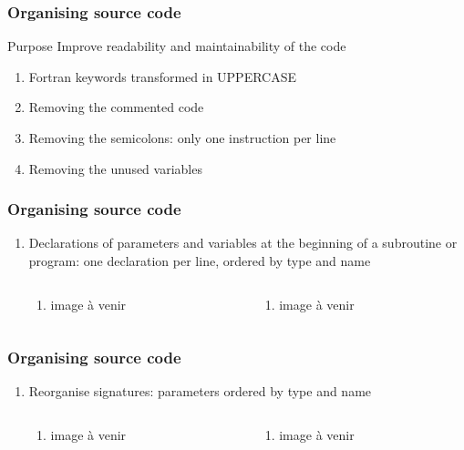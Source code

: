 \documentclass[10p]{beamer}
\begin{document}
\begin{frame}
\frametitle{Organising source code}
\begin{block}{Purpose}
Improve readability and maintainability of the code
\end{block}
\begin{enumerate}
\item Fortran keywords transformed in UPPERCASE
\item Removing the commented code
\item Removing the semicolons: only one instruction per line
\item Removing the unused variables
\end{enumerate}
\end{frame}

\begin{frame}
\frametitle{Organising source code}
\begin{enumerate}
\item Declarations of parameters and variables at the beginning of a subroutine or program: one declaration per line, ordered by type and name
\begin{columns}
\begin{column}{150 pt}
\begin{enumerate}
\item image à venir
\end{enumerate}
\end{column}
\begin{column}{150 pt}
\begin{enumerate}
\item image à venir
\end{enumerate}
\end{column}
\end{columns}
\end{enumerate}
\end{frame}

\begin{frame}
\frametitle{Organising source code}
\begin{enumerate}
\item Reorganise signatures: parameters ordered by type and name
\begin{columns}
\begin{column}{150 pt}
\begin{enumerate}
\item image à venir
\end{enumerate}
\end{column}
\begin{column}{150 pt}
\begin{enumerate}
\item image à venir
\end{enumerate}
\end{column}
\end{columns}
\end{enumerate}
\end{frame}
\end{document}
